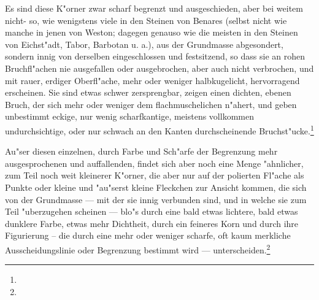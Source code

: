 \documentclass[a4paper, 11pt, oneside, german]{article}
\begin{document}
Es sind diese K"orner zwar scharf begrenzt und ausgeschieden, aber bei weitem nicht- so, wie wenigstens viele in den Steinen von Benares (selbst nicht wie manche in jenen von Weston; dagegen genauso wie die meisten in den Steinen von Eichst"adt, Tabor, Barbotan u. a.), aus der Grundmasse abgesondert, sondern innig von derselben eingeschlossen und festsitzend, so dass sie an rohen Bruchfl"achen nie ausgefallen oder ausgebrochen, aber auch nicht verbrochen, und mit rauer, erdiger Oberfl"ache, mehr oder weniger halbkugelicht, hervorragend erscheinen. Sie sind etwas schwer zersprengbar, zeigen einen dichten, ebenen Bruch, der sich mehr oder weniger dem flachmuschelichen n"ahert, und geben unbestimmt eckige, nur wenig scharfkantige, meistens vollkommen undurchsichtige, oder nur schwach an den Kanten durchscheinende Bruchst"ucke.\footnote{}

Au"ser diesen einzelnen, durch Farbe und Sch"arfe der Begrenzung mehr ausgesprochenen und auffallenden, findet sich aber noch eine Menge "ahnlicher, zum Teil noch weit kleinerer K"orner, die aber nur auf der polierten Fl"ache als Punkte oder kleine und "au"serst kleine Fleckchen zur Ansicht kommen, die sich von der Grundmasse --- mit der sie innig verbunden sind, und in welche sie zum Teil "uberzugehen scheinen --- blo"s durch eine bald etwas lichtere, bald etwas dunklere Farbe, etwas mehr Dichtheit, durch ein feineres Korn und durch ihre Figurierung -- die durch eine mehr oder weniger scharfe, oft kaum merkliche Ausscheidungslinie oder Begrenzung bestimmt wird --- unterscheiden.\footnote{}
\end{document}
